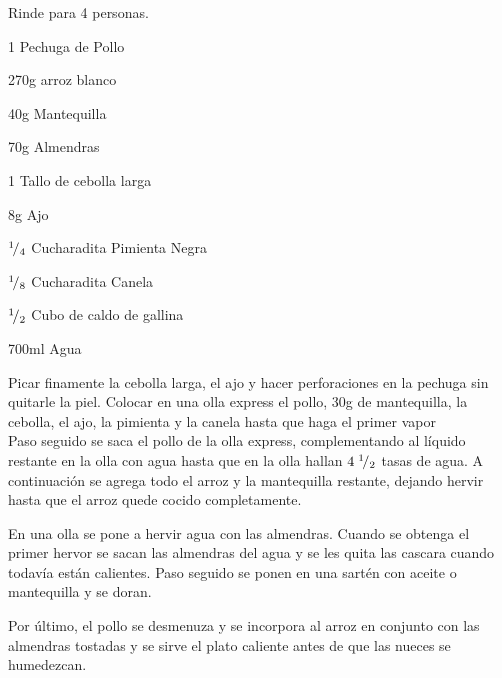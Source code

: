 
Rinde para 4 personas.


\begin{ingredientes}
\item 1 Pechuga de Pollo
\item 270g arroz blanco
\item 40g Mantequilla
\item 70g Almendras
\item 1 Tallo de cebolla larga
\item 8g Ajo
\item ${}^{1}\!/_{4}$ Cucharadita Pimienta Negra
\item ${}^{1}\!/_{8}$ Cucharadita Canela
\item ${}^{1}\!/_{2}$ Cubo de caldo de gallina
\item 700ml Agua
\end{ingredientes}
\preparacion
Picar finamente la cebolla larga, el ajo y hacer perforaciones en la pechuga sin quitarle la piel.
Colocar en una olla express el pollo, 30g de mantequilla, la cebolla, el ajo, la pimienta y la canela hasta que haga el primer vapor \\

Paso seguido se saca el pollo de la olla express, complementando al líquido restante en la olla con agua hasta que en la olla hallan $4\;{}^{1}\!/_{2}$ tasas de agua. A continuación se agrega todo el arroz y la mantequilla restante, dejando hervir hasta que el arroz quede cocido completamente.

En una olla se pone a hervir agua con las almendras. Cuando se obtenga el primer hervor se sacan las almendras del agua y se les quita las cascara cuando todavía están calientes. Paso seguido se ponen en una sartén con aceite o mantequilla y se doran.

Por último, el pollo se desmenuza y se incorpora al arroz en conjunto con las almendras tostadas y se sirve el plato caliente antes de que las nueces se humedezcan.

